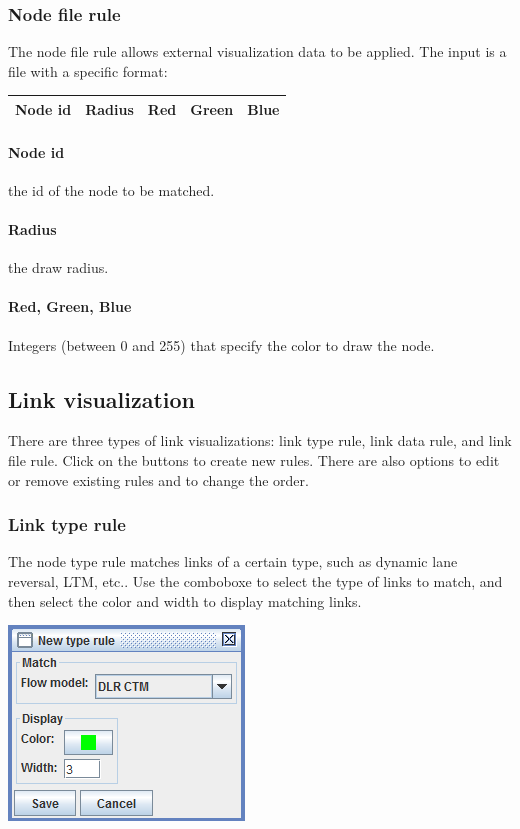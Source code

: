 \subsubsection{Node file rule}
The node file rule allows external visualization data to be applied. The input is a file with a specific format:
\begin{center}
\begin{tabular}{ccccc}
\hline
Node id & Radius & Red & Green & Blue\\\hline
\end{tabular}
\end{center}
\paragraph*{Node id}
the id of the node to be matched.

\paragraph*{Radius} the draw radius.

\paragraph*{Red, Green, Blue} Integers (between 0 and 255) that specify the color to draw the node.

\subsection{Link visualization}

There are three types of link visualizations: link type rule, link data rule, and link file rule. Click on the buttons to create new rules. There are also options to edit or remove existing rules and to change the order.

\subsubsection{Link type rule}

The node type rule matches links of a certain type, such as dynamic lane reversal, LTM, etc.. Use the comboboxe to select the type of links to match, and then select the color and width to display matching links.
\begin{center}
\includegraphics[scale=1]{images/editor6c.png}
\end{center}

